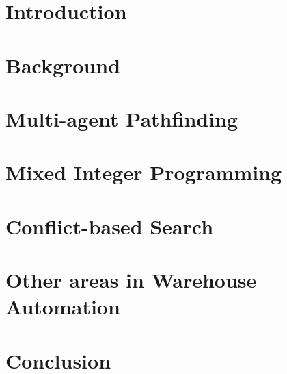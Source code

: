 \documentclass[a4paper,11pt]{article}
\begin{document}
	\section{Introduction}
	
	
	\section{Background}
	
	
	\section{Multi-agent Pathfinding}
	
	
	\section{Mixed Integer Programming}
	
	
	\section{Conflict-based Search}
	
	
	\section{Other areas in Warehouse Automation}
	
	
	\section{Conclusion}
	
	
	
	
	
\end{document}
